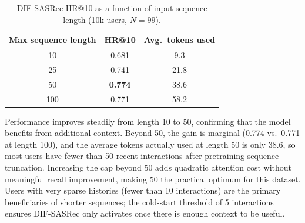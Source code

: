 \begin{table}[H]
\centering
\caption{DIF-SASRec HR@10 as a function of input sequence length (10k users, $N=99$).}
\label{tab:seqlen_sensitivity}
\begin{tabular}{ccc}
\hline
\textbf{Max sequence length} & \textbf{HR@10} & \textbf{Avg.\ tokens used} \\
\hline
10  & 0.681 & 9.3 \\
25  & 0.741 & 21.8 \\
50  & \textbf{0.774} & 38.6 \\
100 & 0.771 & 58.2 \\
\hline
\end{tabular}
\end{table}

Performance improves steadily from length 10 to 50, confirming that the model benefits from additional context.
Beyond 50, the gain is marginal (0.774 vs.\ 0.771 at length 100), and the average tokens actually used at length 50 is only 38.6, so most users have fewer than 50 recent interactions after pretraining sequence truncation.
Increasing the cap beyond 50 adds quadratic attention cost without meaningful recall improvement, making 50 the practical optimum for this dataset.
Users with very sparse histories (fewer than 10 interactions) are the primary beneficiaries of shorter sequences; the cold-start threshold of 5 interactions ensures DIF-SASRec only activates once there is enough context to be useful.
